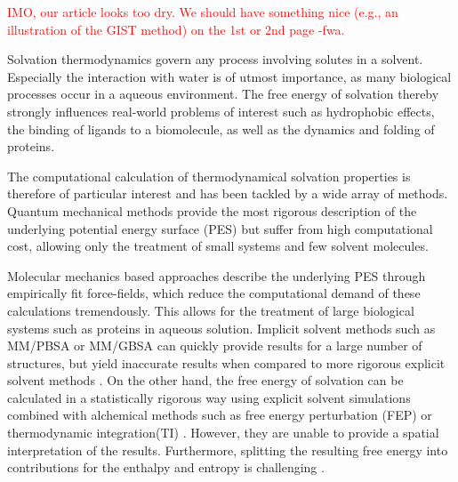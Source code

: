 \documentclass[9pt,tutorial]{livecoms}
\newcommand{\todo}{\textcolor{red}}
\begin{document}
\todo{IMO, our article looks too dry. We should have something nice (e.g., an illustration of the GIST method) on the 1st or 2nd page -fwa.}


Solvation thermodynamics govern any process involving solutes in a solvent.
Especially the interaction with water is of utmost importance, as many biological processes occur in a aqueous environment. 
The free energy of solvation thereby strongly influences real-world problems of interest such as hydrophobic effects, the binding of ligands to a biomolecule, as well as the dynamics and folding of proteins.

The computational calculation of thermodynamical solvation properties is therefore of particular interest and has been tackled by a wide array of methods.
Quantum mechanical methods provide the most rigorous description of the underlying potential energy surface (PES) but suffer from high computational cost, allowing only the treatment of small systems and few solvent molecules. 

Molecular mechanics based approaches describe the underlying PES through empirically fit force-fields, which reduce the computational demand of these calculations tremendously.
This allows for the treatment of large biological systems such as proteins in aqueous solution.
Implicit solvent methods such as MM/PBSA or MM/GBSA \cite{Sitkoff1994-pbsa,Kollman2000-mmpbsa} can quickly provide results for a large number of structures, but yield inaccurate results when compared to more rigorous explicit solvent methods \cite{Genheden2015-mmpbsa-review}.
On the other hand, the free energy of solvation can be calculated in a statistically rigorous way using explicit solvent simulations combined with alchemical methods such as free energy perturbation (FEP) \cite{Zwanzig1954-reweighting} or thermodynamic integration(TI) \cite{Kirkwood1935-ti}.
However, they are unable to provide a spatial interpretation of the results.
Furthermore, splitting the resulting free energy into contributions for the enthalpy and entropy is challenging \cite{Peter2004-alchemical-entropy}.
\end{document}
